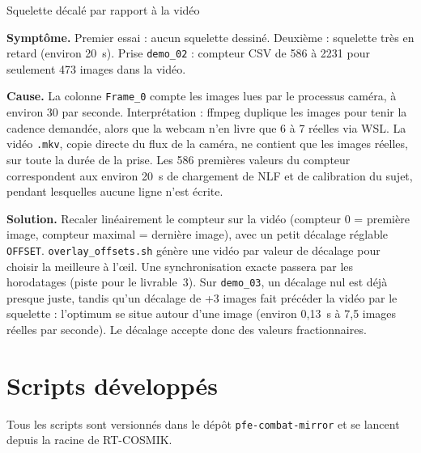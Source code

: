 \documentclass[11pt,a4paper]{article}
\newcommand{\symptome}[1]{\par\noindent\textbf{Symptôme.} #1}
\newcommand{\cause}[1]{\par\smallskip\noindent\textbf{Cause.} #1}
\newcommand{\solution}[1]{\par\smallskip\noindent\textbf{Solution.} #1}
\newcommand{\code}[1]{\texttt{\small #1}}
\begin{document}
\begin{probleme}{Squelette décalé par rapport à la vidéo}
\symptome{Premier essai : aucun squelette dessiné. Deuxième : squelette très en retard (environ 20~s). Prise \code{demo\_02} : compteur CSV de 586 à 2231 pour seulement 473 images dans la vidéo.}
\cause{La colonne \code{Frame\_0} compte les images lues par le processus caméra, à environ 30 par seconde. Interprétation : ffmpeg duplique les images pour tenir la cadence demandée, alors que la webcam n'en livre que 6 à 7 réelles via WSL. La vidéo \code{.mkv}, copie directe du flux de la caméra, ne contient que les images réelles, sur toute la durée de la prise. Les 586 premières valeurs du compteur correspondent aux environ 20~s de chargement de NLF et de calibration du sujet, pendant lesquelles aucune ligne n'est écrite.}
\solution{Recaler linéairement le compteur sur la vidéo (compteur 0 = première image, compteur maximal = dernière image), avec un petit décalage réglable \code{OFFSET}. \code{overlay\_offsets.sh} génère une vidéo par valeur de décalage pour choisir la meilleure à l'\oe il. Une synchronisation exacte passera par les horodatages (piste pour le livrable~3). Sur \code{demo\_03}, un décalage nul est déjà presque juste, tandis qu'un décalage de +3 images fait précéder la vidéo par le squelette : l'optimum se situe autour d'une image (environ 0,13~s à 7,5 images réelles par seconde). Le décalage accepte donc des valeurs fractionnaires.}
\end{probleme}

\section{Scripts développés}

Tous les scripts sont versionnés dans le dépôt \code{pfe-combat-mirror} et se lancent depuis la racine de RT-COSMIK.
\end{document}
